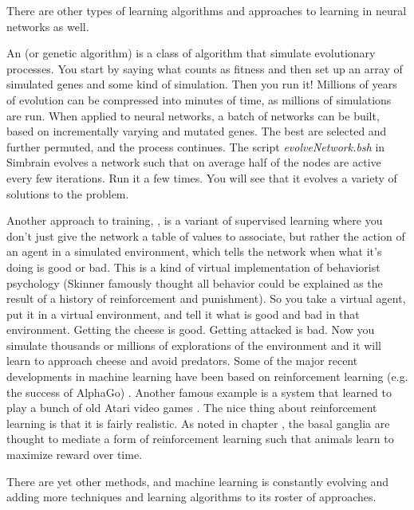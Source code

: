 There are other types of learning algorithms and approaches to learning in neural networks as well.

An  (or genetic algorithm) is a class of algorithm that simulate evolutionary processes. You start by saying what counts as fitness and then set up an array of simulated genes and some kind of simulation. Then you run it!  Millions of years of evolution can be compressed into minutes of time, as millions of simulations are run. When applied to neural networks, a batch of networks can be built, based on incrementally varying and mutated genes. The best are selected and further permuted, and the process continues. The script \emph{evolveNetwork.bsh} in Simbrain evolves a network such that on average half of the nodes are active every few iterations. Run it a few times. You will see that it evolves a variety of solutions to the problem.

Another approach to training, , is a variant of supervised learning where you don't just give the network a table of values to associate, but rather the action of an agent in a simulated environment, which tells the network when what it's doing is good or bad. This is a kind of virtual implementation of behaviorist psychology (Skinner famously thought all behavior could be explained as the result of a history of reinforcement and punishment). So you take a virtual agent, put it in a virtual environment, and tell it what  is good and bad in that environment. Getting the cheese is good. Getting attacked is bad. Now you simulate thousands or millions of explorations of the environment and it will learn to approach cheese and avoid predators. Some of the major recent developments in machine learning have been based on reinforcement learning (e.g. the success of AlphaGo) \cite{silver2016mastering}. Another famous example is a system that learned to play a bunch of old Atari video games \cite{mnih2013playing}. The nice thing about reinforcement learning is that it is fairly realistic. As noted in chapter , the basal ganglia are thought to mediate a form of reinforcement learning such that animals learn to maximize reward over time. 

There are yet other methods, and machine learning is constantly evolving and adding more techniques and learning algorithms to its roster of approaches. 

